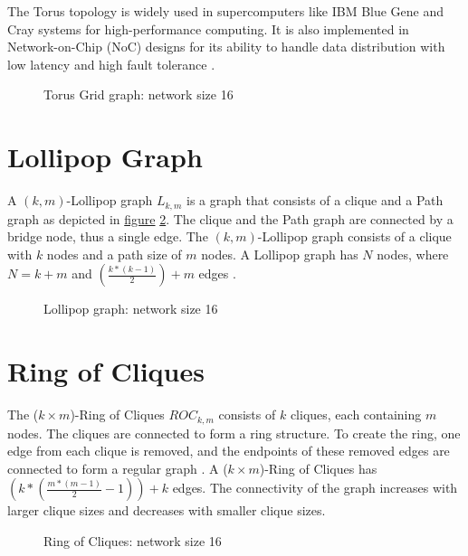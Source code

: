 The Torus topology is widely used in supercomputers like IBM Blue Gene and Cray systems for high-performance computing. It is also implemented in Network-on-Chip (NoC) designs for its ability to handle data distribution with low latency and high fault tolerance \cite{Banerjee2001}.

\begin{figure}[H]
    \centering
    \scalebox{1.5}{}
    \caption{Torus Grid graph: network size 16}
    \label{fig:torusGraph}
\end{figure}

\section{Lollipop Graph}\label{sec:2lollipopgraph}
A $(k, m)$-Lollipop graph $L_{k,m}$ is a graph that consists of a clique and a Path graph as depicted in \hyperref[fig:lollipopgraphDemo]{figure} \ref{fig:lollipopgraphDemo}. The clique and the Path graph are connected by a bridge node, thus a single edge. The $(k, m)$-Lollipop graph consists of a clique with $k$ nodes and a path size of $m$ nodes. A Lollipop graph has $N$ nodes, where $N = k+m$ and $(\frac{k*(k-1)}{2})+m$ edges \cite{JonassonLollipopGraphs2000}.

\begin{figure}[H]
    \centering
    \scalebox{1}{}
    \caption{Lollipop graph: network size 16}
    \label{fig:lollipopgraphDemo}
\end{figure}

\section{Ring of Cliques}\label{sec:2ringofcliquegraph}
The ($k \times m$)-Ring of Cliques $ROC_{k,m}$ consists of $k$ cliques, each containing $m$ nodes. The cliques are connected to form a ring structure. To create the ring, one edge from each clique is removed, and the endpoints of these removed edges are connected to form a regular graph \cite{Mahlmann2010}. A ($k \times m$)-Ring of Cliques has $\left( k * \left(\frac{m * (m - 1)}{2}-1 \right) \right)+k$ edges. The connectivity of the graph increases with larger clique sizes and decreases with smaller clique sizes.

\begin{figure}[H]
    \centering
    \scalebox{1}{}
    \caption{Ring of Cliques: network size 16}
    \label{fig:ringofcliquesDemo}
\end{figure}

